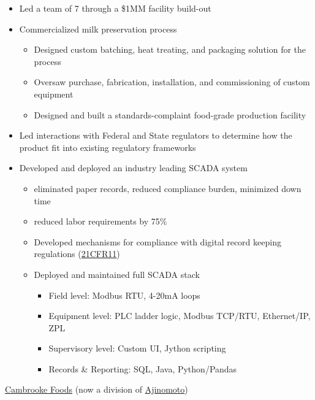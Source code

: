 \documentclass[10pt,a4paper]{article} %
\begin{document}
{{{\begin{itemize}
\item Led a team of 7 through a \$1MM facility build-out 
\item Commercialized milk preservation process
\begin{itemize}
\item Designed custom batching, heat treating, and packaging solution for the process
\item Oversaw purchase, fabrication, installation, and commissioning of custom equipment
\item Designed and built a standards-complaint food-grade production facility
\end{itemize}
\item Led interactions with Federal and State regulators to determine how the product fit into existing regulatory frameworks
\item Developed and deployed an industry leading SCADA system
	\begin{itemize}
\item eliminated paper records, reduced compliance burden, minimized down time
\item reduced labor requirements by 75\%
\item Developed mechanisms for compliance with digital record keeping regulations (\href{https://en.m.wikipedia.org/wiki/Title_21_CFR_Part_11}{21CFR11})
\item Deployed and maintained full SCADA stack
		\begin{itemize}
		\item Field level: Modbus RTU, 4-20mA loops
		\item Equipment level: PLC ladder logic, Modbus TCP/RTU, Ethernet/IP, ZPL
		\item Supervisory level: Custom UI, Jython scripting
		\item Records \& Reporting: SQL, Java, Python/Pandas
		\end{itemize}
	\end{itemize}


\end{itemize}
}
}
}
\headedsection %
{\href{http://www.cambrooke.com}{Cambrooke Foods} (now a division of \href{https://www.ajinorthamerica.com/}{Ajinomoto})}
\end{document}
